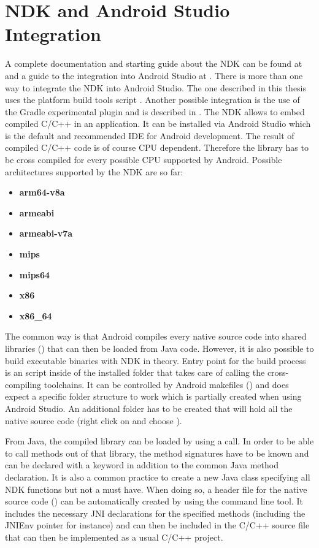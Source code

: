 \section{NDK and Android Studio Integration}\label{section:ndk_integration}
A complete documentation and starting guide about the NDK can be found at \parencite{ndk} and a guide to the integration into Android Studio at \parencite{ndk_integration}.
There is more than one way to integrate the NDK into Android Studio. The one described
in this thesis uses the platform build tools script . Another possible
integration is the use of the Gradle experimental plugin and is described in \parencite{gradle_experimental}.
The NDK allows to embed compiled C/C++ in an application. It can be installed via Android Studio which is the default and recommended IDE for Android development.
The result of compiled C/C++ code is of course CPU dependent. Therefore the library has to be cross compiled for
every possible CPU supported by Android. Possible architectures supported by the NDK are so far:
\begin{itemize}
\item \textbf{arm64-v8a}
\item \textbf{armeabi}
\item \textbf{armeabi-v7a}
\item \textbf{mips}
\item \textbf{mips64}
\item \textbf{x86}
\item \textbf{x86\_64}
\end{itemize}
The common way is that Android compiles every native source code into shared libraries
() that can then be loaded from Java code. However, it is also possible to build executable binaries with NDK in theory. Entry point for the build process is an  script inside of the installed  folder that takes care of calling the cross-compiling toolchains. It can be controlled by Android makefiles () and does
expect a specific folder structure to work which is partially created when using Android Studio. An additional  folder has to be created that will hold all the native source code (right click on  and choose ).

From Java, the compiled library can be loaded by using a
 call. In order to be able to call methods out
of that library, the method signatures have to be known and can be declared with
a  keyword in addition to the common Java method declaration. It is also a
common practice to create a new Java class specifying all NDK functions but not a must have. When doing so, a header file for the native source code () can be automatically
created by using the  command line tool. It includes the necessary JNI
declarations for the specified methods (including the JNIEnv pointer for instance)
and can then be included in the C/C++ source file that can then be implemented as a
usual C/C++ project.

